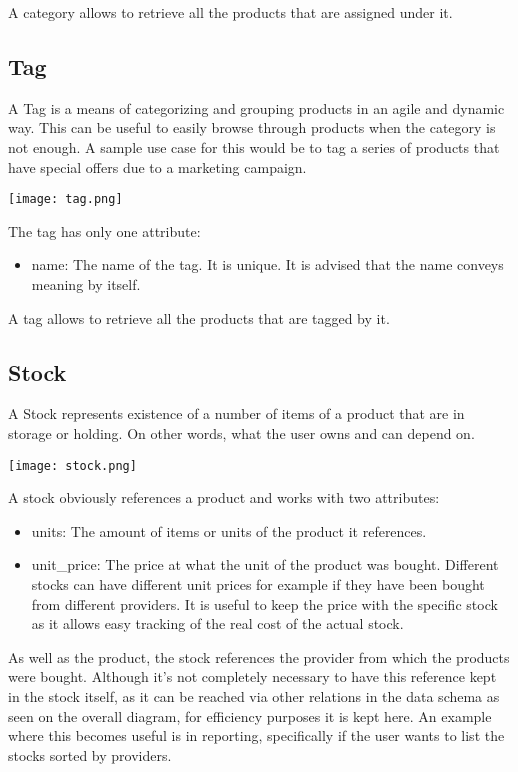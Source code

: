 A category allows to retrieve all the products that are assigned under it.

\subsection{Tag}
A Tag is a means of categorizing and grouping products in an agile and dynamic way. This can be useful to easily browse through products when the category is not enough. A sample use case for this would be to tag a series of products that have special offers due to a marketing campaign.
\begin{center}
\texttt{[image: tag.png]}
\end{center}
The tag has only one attribute:

\begin{itemize}
\item name: The name of the tag. It is unique. It is advised that the name conveys meaning by itself.
\end{itemize}

A tag allows to retrieve all the products that are tagged by it.

\subsection{Stock}
A Stock represents existence of a number of items of a product that are in storage or holding. On other words, what the user owns and can depend on. 
\begin{center}
\texttt{[image: stock.png]}
\end{center}
A stock obviously references a product and works with two attributes:

\begin{itemize}
\item units: The amount of items or units of the product it references.
\item unit\_price: The price at what the unit of the product was bought. Different stocks can have different unit prices for example if they have been bought from different providers. It is useful to keep the price with the specific stock as it allows easy tracking of the real cost of the actual stock.
\end{itemize}

As well as the product, the stock references the provider from which the products were bought. Although it’s not completely necessary to have this reference kept in the stock itself, as it can be reached via other relations in the data schema as seen on the overall diagram, for efficiency purposes it is kept here. An example where this becomes useful is in reporting, specifically if the user wants to list the stocks sorted by providers.

